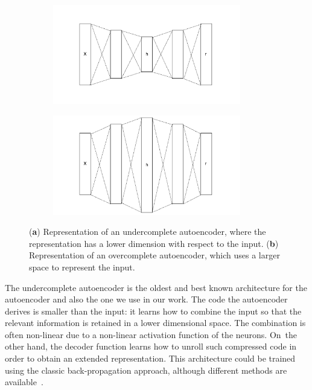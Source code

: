 \begin{figure}[H]
\centering
\begin{subfigure}[H]{0.3\textwidth}
\centering
\includegraphics[width=0.9\textwidth]{images/05-modeling/undercomplete_autoencoder}
\caption{}
\label{figure:undercomplete}
\end{subfigure}
\begin{subfigure}[H]{0.3\textwidth}
\centering
\includegraphics[width=0.9\textwidth]{images/05-modeling/overcomplete_autoencoder}
\caption{}
\label{figure:overcomplete}
\end{subfigure}  \vspace{-6pt}
\caption{(\textbf{a}) Representation of an undercomplete autoencoder, where the representation has a lower dimension with respect to the input. (\textbf{b}) Representation of an overcomplete autoencoder, which uses a larger space to represent the input.}
\label{fig:under_over_autoencoder}
\end{figure}

The undercomplete autoencoder is the oldest and best known architecture for the autoencoder and also the one we use in our work. The code the autoencoder derives is smaller than the input: it learns how to combine the input so that the relevant information is retained in a lower dimensional space. The combination is often non-linear due to a non-linear activation function of the neurons. On~the other hand, the decoder function learns how to unroll such compressed code in order to obtain an extended representation. This architecture could be trained using the classic back-propagation approach, although different methods are available~\cite{goodfellow_deep_2016}.

